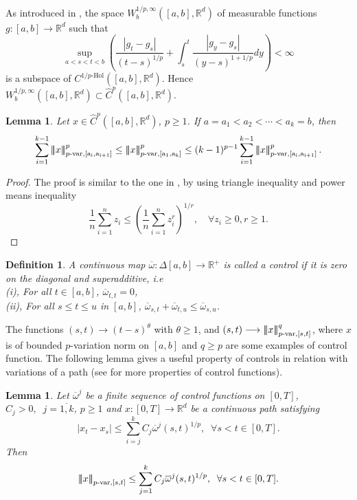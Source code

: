 \documentclass[10pt]{article}
\numberwithin{equation}{section} %
\newcommand{\R}{\ensuremath{\mathbb{R}}}
\newcommand{\ltn}{\ensuremath{\left| \! \left| \! \left|}}
\newcommand{\rtn}{\ensuremath{\right| \! \right| \! \right|}}
\newtheorem{definition}[theorem]{Definition}
\newtheorem{lemma}[theorem]{Lemma}
\begin{document}
As introduced in \cite{nualart3}, the space $W_b^{1/p,\infty}([a,b],\R^d)$ of measurable
functions $g :[a,b] \rightarrow \R^d$ such that 
$$\sup_{a<s<t<b}\left(\frac{|g_t-g_s|}{(t-s)^{1/p}}+\int_s^t\frac{|g_y-g_s|}{(y-s)^{1+1/p}}dy\right)<\infty$$
is a subspace of $C^{1/p\text{-Hol}}([a,b],\R^d)$. Hence $W_b^{1/p,\infty}([a,b],\R^d)\subset \widehat{C}^p([a,b],\R^d) $.
\begin{lemma}\label{additive}
Let $x\in \widehat{C}^{p}([a,b],\R^d)$, $p\geq 1$. If $a = a_1<a_2<\cdots < a_k = b$, then 
$$
\sum_{i=1}^{k-1}\ltn x\rtn^p_{p\text{-}\rm{var},[a_i,a_{i+1}]}\leq \ltn x\rtn^p_{p\text{-}\rm{var},[a_1,a_k]}\leq (k-1)^{p-1}\sum_{i=1}^{k-1}\ltn x\rtn^p_{p\text{-}\rm{var},[a_i,a_{i+1}]}.
$$ 
\end{lemma}
\begin{proof}
The proof is similar to the one in \cite[p.\ 84]{friz}, by using triangle inequality and power means inequality
 \begin{equation*}
 \frac{1}{n}\sum_{i=1}^n z_i \leq \left(\frac{1}{n}\sum_{i=1}^nz_i^r\right)^{1/r},\quad \forall z_i\geq 0, r\geq 1.
 \end{equation*}
\end{proof}
\begin{definition}
A continuous map $\overline{\omega}: \Delta[a,b]\longrightarrow \R^+$ is called a control if it is zero on the diagonal and superadditive, i.e\\
(i), For all $t\in [a,b]$, $\overline{\omega}_{t,t}=0$,\\
(ii), For all $s\leq t\leq u$ in $[a,b]$, $\overline{\omega}_{s,t}+\overline{\omega}_{t,u}\leq \overline{\omega}_{s,u}$.
\end{definition}
The functions $(s,t)\longrightarrow (t-s)^{\theta}$ with $\theta \geq 1$, and  $(s,t)\longrightarrow \ltn x\rtn^q_{p\text{-var},[s,t]}$, where $x$ is of bounded $p$-variation norm on $[a,b]$ and $q\geq p$ are some examples of control function. The following lemma gives a useful property of controls in relation with variations of a path (see \cite{friz} for more properties of control functions).
\begin{lemma}\label{controled}
Let $\overline{\omega}^j$ be a finite sequence of control functions on $[0,T]$, $C_j>0,\;\;j=\overline{1,k}$, $p\geq 1$ and  $x:[0,T]\rightarrow \R^d$ be a continuous path satisfying
$$|x_t-x_s|\leq \sum_{i=j}^k C_j \overline{\omega}^j(s,t)^{1/p},\;\; \forall s<t \in [0,T].$$
Then 
\begin{eqnarray}
\ltn x\rtn_{p\text{-}{\rm {var}},[s,t]}\leq \sum_{j=1}^k C_j \overline{\omega}^j(s,t)^{1/p},\;\; \forall s<t \in [0,T].
\end{eqnarray}
\end{lemma}
\end{document}
